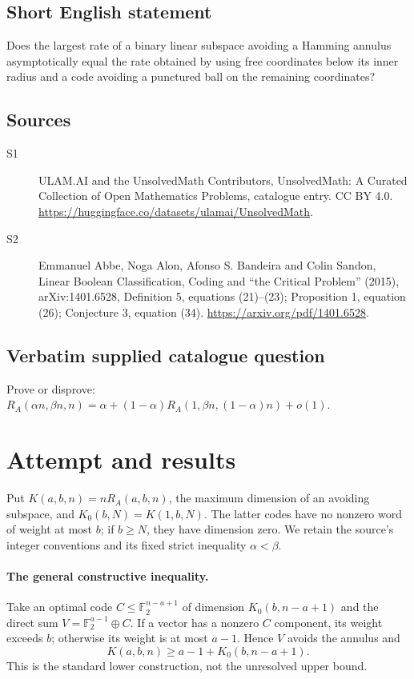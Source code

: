 \documentclass[11pt]{article}
\begin{document}
\subsection{Short English statement}
Does the largest rate of a binary linear subspace avoiding a Hamming annulus asymptotically equal the rate obtained by using free coordinates below its inner radius and a code avoiding a punctured ball on the remaining coordinates?
\subsection{Sources}
\begin{description}
\item[S1] ULAM.AI and the UnsolvedMath Contributors, UnsolvedMath: A Curated Collection of Open Mathematics Problems, catalogue entry. CC BY 4.0. \url{https://huggingface.co/datasets/ulamai/UnsolvedMath}.
\item[S2] Emmanuel Abbe, Noga Alon, Afonso S. Bandeira and Colin Sandon, Linear Boolean Classification, Coding and “the Critical Problem” (2015), arXiv:1401.6528, Definition 5, equations (21)–(23); Proposition 1, equation (26); Conjecture 3, equation (34). \url{https://arxiv.org/pdf/1401.6528}.
\end{description}
\subsection{Verbatim supplied catalogue question}
Prove or disprove: $R_A(\alpha n,\beta n,n)=\alpha+(1-\alpha)R_A(1,\beta n,(1-\alpha)n)+o(1)$.

\section{Attempt and results}
Put $K(a,b,n)=nR_A(a,b,n)$, the maximum dimension of an avoiding subspace,
and $K_0(b,N)=K(1,b,N)$. The latter codes have no nonzero word of weight
at most $b$; if $b\ge N$, they have dimension zero. We retain the source's
integer conventions and its fixed strict inequality $\alpha<\beta$.

\paragraph{The general constructive inequality.}
Take an optimal code $C\le\mathbb F_2^{n-a+1}$ of dimension $K_0(b,n-a+1)$
and the direct sum $V=\mathbb F_2^{a-1}\oplus C$. If a vector has a nonzero
$C$ component, its weight exceeds $b$; otherwise its weight is at most
$a-1$. Hence $V$ avoids the annulus and
\[
K(a,b,n)\ge a-1+K_0(b,n-a+1).
\]
This is the standard lower construction, not the unresolved upper bound.
\end{document}
